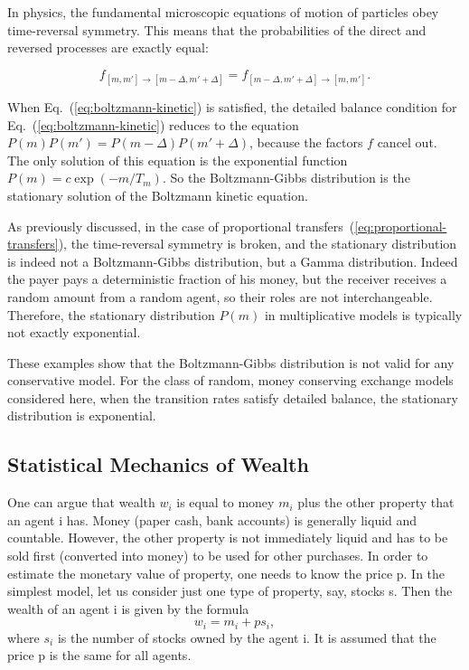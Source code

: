 In physics, the fundamental microscopic equations of motion of
particles obey time-reversal symmetry. This means that the
probabilities of the direct and reversed processes are exactly equal:

\begin{equation}
    f_{[m,m']\rightarrow[m-\Delta,m'+\Delta]}
    =
    f_{[m-\Delta,m'+\Delta]\rightarrow[m,m']}.
\end{equation}

When Eq.~(\ref{eq:boltzmann-kinetic}) is satisfied, the detailed balance condition for
Eq.~(\ref{eq:boltzmann-kinetic}) reduces to the equation
$P(m)P(m') = P(m-\Delta)P(m'+\Delta)$,
because the factors $f$ cancel out. The only solution of this equation
is the exponential function $P(m) = c\exp(-m/T_m)$. So the Boltzmann-Gibbs distribution is the stationary solution of the
Boltzmann kinetic equation. 

As previously discussed, in the case of proportional transfers~(\ref{eq:proportional-transfers}), the time-reversal symmetry is broken, 
and the stationary distribution is indeed not a Boltzmann-Gibbs distribution, but a Gamma distribution.
Indeed the payer pays a deterministic fraction of his money, but
the receiver receives a random amount from a random
agent, so their roles are not interchangeable.
Therefore, the stationary distribution $P(m)$ in multiplicative
models is typically not exactly exponential.

These examples show that the Boltzmann-Gibbs 
distribution is not valid for any conservative model.
For the class of random, money conserving exchange models considered here, when the transition rates satisfy detailed balance, 
the stationary distribution is exponential.

\subsection{Statistical Mechanics of Wealth}
\label{sec:wealth}
One can argue that wealth $w_i$ is equal to money $m_i$ plus
the other property that an agent i has. 
Money (paper cash, bank accounts) is generally liquid and countable. 
However, the other property
is not immediately liquid and has to be sold first 
(converted into money) to be used for other purchases. In
order to estimate the monetary value of property, one
needs to know the price p. In the simplest model, let us
consider just one type of property, say, stocks s. Then
the wealth of an agent i is given by the formula
\begin{equation}
    w_i = m_i + p s_i,
\end{equation}
where $s_i$ is the number of stocks owned by the agent i. 
It is assumed that the price p is the same for all agents.

